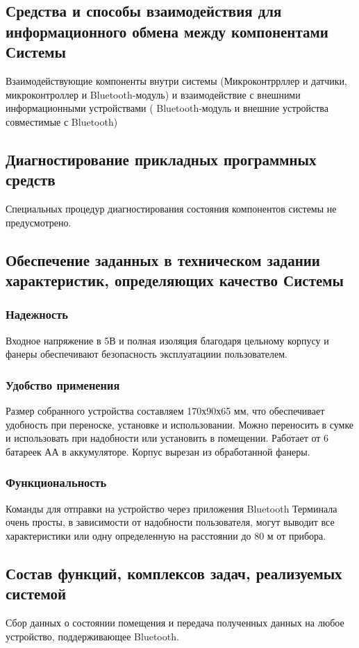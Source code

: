 \documentclass[12pt,a4paper]{scrartcl}
\begin{document}
 		\subsection{Средства и способы взаимодействия для информационного обмена между компонентами Системы }
 	Взаимодействующие компоненты внутри системы (Микроконтррллер и датчики, микроконтроллер и  Bluetooth-модуль) и взаимодействие с внешними информационными устройствами ( Bluetooth-модуль и внешние устройства совместимые с Bluetooth)
 	
 		\subsection{Диагностирование прикладных программных средств }
 	Специальных процедур диагностирования состояния компонентов системы не предусмотрено.
 	
 		\subsection{Обеспечение заданных в техническом задании характеристик, определяющих качество Системы }
 			\subsubsection{Надежность}
 	Входное напряжение в 5В и полная изоляция благодаря цельному корпусу и фанеры обеспечивают безопасность эксплуатациии пользователем.
 			\subsubsection{Удобство применения}
 	Размер собранного устройства составляем 170х90х65 мм, что обеспечивает удобность при переноске, установке и использовании. Можно переносить в сумке и использовать при надобности или установить в помещении. Работает от 6 батареек АА в аккумуляторе. Корпус вырезан из обработанной фанеры.
 			\subsubsection{Функциональность}
 	Команды для отправки на устройство через приложения Bluetooth Терминала очень просты, в зависимости от надобности пользователя, могут выводит все характеристики или одну определенную на расстоянии до 80 м от прибора.
 	
 		\subsection{Состав функций, комплексов задач, реализуемых системой }
 	Сбор данных о состоянии помещения и передача полученных данных на любое устройство, поддерживающее Bluetooth.
 	
\end{document}
